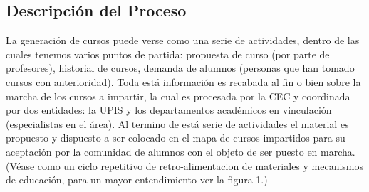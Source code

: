 \subsection{Descripción del Proceso}
	La generación de cursos puede verse como una serie de actividades, dentro de las cuales tenemos varios puntos de partida: propuesta de curso (por parte de profesores), historial de cursos, demanda de alumnos (personas que han tomado cursos con anterioridad). Toda está información es recabada al fin o bien sobre la marcha de los cursos a impartir, la cual es procesada por la CEC y coordinada por dos entidades: la UPIS y los departamentos académicos en vinculación (especialistas en el área). Al termino de está serie de actividades el material es propuesto y dispuesto a ser colocado en el mapa de cursos impartidos para su aceptación por la comunidad de alumnos con el objeto de ser puesto en marcha.(Véase como un ciclo repetitivo de retro-alimentacion de materiales y mecanismos de educación, para un mayor entendimiento ver la figura 1.)

